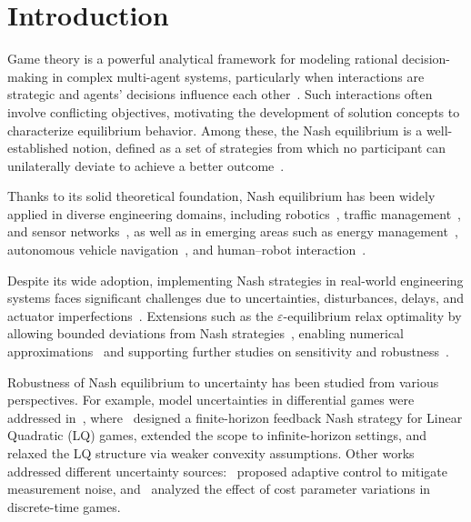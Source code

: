 \documentclass[letterpaper, 10 pt, conference]{ieeeconf}  %
\begin{document}


\section{Introduction}
\label{sec:introduction}

Game theory is a powerful analytical framework for modeling rational decision-making in complex multi-agent systems, particularly when interactions are strategic and agents’ decisions influence each other~\cite{shamma2020game,basar1999dynamic}. Such interactions often involve conflicting objectives, motivating the development of solution concepts to characterize equilibrium behavior. Among these, the Nash equilibrium is a well-established notion, defined as a set of strategies from which no participant can unilaterally deviate to achieve a better outcome~\cite{nash1950equilibrium}.

Thanks to its solid theoretical foundation, Nash equilibrium has been widely applied in diverse engineering domains, including robotics~\cite{chiu2021encoding}, traffic management~\cite{Oszczypała2023Nash}, and sensor networks~\cite{Zheng2023game}, as well as in emerging areas such as energy management~\cite{YANG2020216nashQ,abdolmohammadi2024sizing}, autonomous vehicle navigation~\cite{nazari2024powertrain, bouzidi2025interaction, abtahi2025multi}, and human–robot interaction~\cite{soltanian2025peerawarecostestimationnonlinear}.

Despite its wide adoption, implementing Nash strategies in real-world engineering systems faces significant challenges due to uncertainties, disturbances, delays, and actuator imperfections~\cite{van-den=broek2023,AMATO2002507_guaranteeing,ma2024ϵ}. Extensions such as the $\varepsilon$-equilibrium relax optimality by allowing bounded deviations from Nash strategies~\cite{TANAKA1991413}, enabling numerical approximations~\cite{NORTMANN20231760,alvarez2009urban} and supporting further studies on sensitivity and robustness~\cite{van-den=broek2023,AMATO2002507_guaranteeing,Jimenez01072006,tan2005sensitivity,hernandez2024ϵ}.

Robustness of Nash equilibrium to uncertainty has been studied from various perspectives. For example, model uncertainties in differential games were addressed in~\cite{van-den=broek2023,AMATO2002507_guaranteeing,hernandez2024ϵ}, where~\cite{van-den=broek2023} designed a finite-horizon feedback Nash strategy for Linear Quadratic (LQ) games, \cite{AMATO2002507_guaranteeing} extended the scope to infinite-horizon settings, and \cite{hernandez2024ϵ} relaxed the LQ structure via weaker convexity assumptions. Other works addressed different uncertainty sources:~\cite{Jimenez01072006} proposed adaptive control to mitigate measurement noise, and~\cite{tan2005sensitivity} analyzed the effect of cost parameter variations in discrete-time games.
\end{document}
